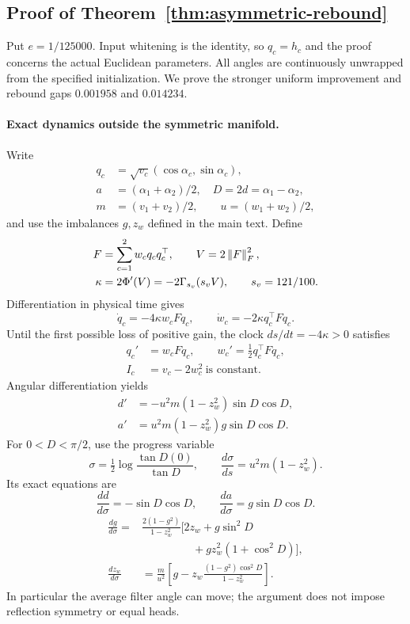 \subsection{Proof of Theorem~\ref{thm:asymmetric-rebound}}
\label{app:asymmetric-stability}
Put $e=1/125000$. Input whitening is the identity, so $q_c=h_c$ and the proof concerns the actual Euclidean parameters. All angles are continuously unwrapped from the specified initialization. We prove the stronger uniform improvement and rebound gaps $0.001958$ and $0.014234$.

\paragraph{Exact dynamics outside the symmetric manifold.}
Write
\begin{align}
 q_c&=\sqrt{v_c}(\cos\alpha_c,\sin\alpha_c),\\
 a&=(\alpha_1+\alpha_2)/2,\quad D=2d=\alpha_1-\alpha_2,\\
 m&=(v_1+v_2)/2,\qquad u=(w_1+w_2)/2,
\end{align}
and use the imbalances $g,z_w$ defined in the main text. Define
\begin{align}
 F&=\sum_{c=1}^2w_cq_cq_c^\top,\qquad V=2\left\lVert F\right\rVert_F^2,\\
 \kappa&=2\Phi'(V)=-2\Gamma_{s_v}(s_vV),\qquad s_v=121/100.
\end{align}
Differentiation in physical time gives
\begin{equation}
 \dot q_c=-4\kappa w_cFq_c,\qquad
 \dot w_c=-2\kappa q_c^\top Fq_c.
\end{equation}
Until the first possible loss of positive gain, the clock $ds/dt=-4\kappa>0$ satisfies
\begin{align}
 q_c'&=w_cFq_c,\qquad w_c'=\tfrac12q_c^\top Fq_c,\\
 I_c&=v_c-2w_c^2\ \text{is constant}.
 \label{eq:asym-invariants}
\end{align}
Angular differentiation yields
\begin{align}
 d'&=-u^2m(1-z_w^2)\sin D\cos D,\\
 a'&=u^2m(1-z_w^2)g\sin D\cos D.
\end{align}
For $0<D<\pi/2$, use the progress variable
\begin{equation}
 \sigma=\tfrac12\log\frac{\tan D(0)}{\tan D},\qquad
 \frac{d\sigma}{ds}=u^2m(1-z_w^2).
 \label{eq:asym-progress}
\end{equation}
Its exact equations are
\begin{equation}
 \frac{dd}{d\sigma}=-\sin D\cos D,\qquad
 \frac{da}{d\sigma}=g\sin D\cos D.
\end{equation}
\begin{align}
 \frac{dg}{d\sigma}
 ={}&\frac{2(1-g^2)}{1-z_w^2}
 \big[2z_w+g\sin^2D\nonumber\\
 &\hspace{55pt}{}+gz_w^2(1+\cos^2D)\big],
 \label{eq:asym-g}\\
 \frac{dz_w}{d\sigma}
 &=\frac m{u^2}\left[g-z_w\frac{(1-g^2)\cos^2D}{1-z_w^2}\right].
 \label{eq:asym-z}
\end{align}
In particular the average filter angle can move; the argument does not impose reflection symmetry or equal heads.

